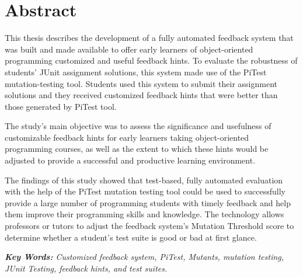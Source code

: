 \chapter*{Abstract}
This thesis describes the development of a fully automated feedback system that was built and made available to offer early learners of object-oriented programming customized and useful feedback hints. To evaluate the robustness of students' JUnit assignment solutions, this system made use of the PiTest mutation-testing tool. Students used this system to submit their assignment solutions and they received customized feedback hints that were better than those generated by PiTest tool.\par

The study's main objective was to assess the significance and usefulness of customizable feedback hints for early learners taking object-oriented programming courses, as well as the extent to which these hints would be adjusted to provide a successful and productive learning environment.\par

The findings of this study showed that test-based, fully automated evaluation with the help of the PiTest mutation testing tool could be used to successfully provide a large number of programming students with timely feedback and help them improve their programming skills and knowledge.  The technology allows professors or tutors to adjust the feedback system's Mutation Threshold score to determine whether a student's test suite is good or bad at first glance.
\newline

\textit{\textbf{Key Words:} Customized feedback system, PiTest, Mutants, mutation testing, JUnit Testing, feedback hints, and test suites.}


